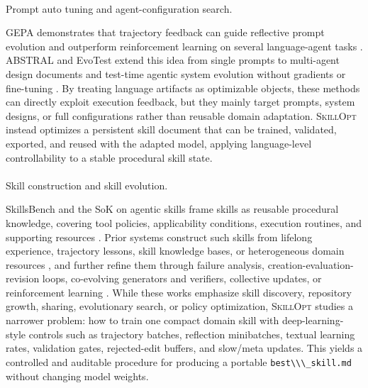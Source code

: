 \documentclass[
]{article}
\makeatletter
\let\oldparagraph\paragraph
\renewcommand{\paragraph}{
    \@ifstar
      \xxxParagraphStar
      \xxxParagraphNoStar
  }
\newcommand{\xxxParagraphStar}[1]{\oldparagraph*{#1}\mbox{}}
\newcommand{\xxxParagraphNoStar}[1]{\oldparagraph{#1}\mbox{}}
\newcommand{\passthrough}[1]{#1}
\newcommand{\ourmethod}{\textsc{SkillOpt}\xspace}
\makeatother
\begin{document}
\paragraph{Prompt auto tuning and agent-configuration
search.}\label{prompt-auto-tuning-and-agent-configuration-search.}

GEPA demonstrates that trajectory feedback can guide reflective prompt
evolution and outperform reinforcement learning on several
language-agent tasks \citep{agrawal2025gepa}. ABSTRAL and EvoTest extend
this idea from single prompts to multi-agent design documents and
test-time agentic system evolution without gradients or fine-tuning
\citep{song2026abstral, he2025evotest}. By treating language artifacts
as optimizable objects, these methods can directly exploit execution
feedback, but they mainly target prompts, system designs, or full
configurations rather than reusable domain adaptation. \ourmethod{}
instead optimizes a persistent skill document that can be trained,
validated, exported, and reused with the adapted model, applying
language-level controllability to a stable procedural skill state.

\paragraph{Skill construction and skill
evolution.}\label{skill-construction-and-skill-evolution.}

SkillsBench and the SoK on agentic skills frame skills as reusable
procedural knowledge, covering tool policies, applicability conditions,
execution routines, and supporting resources
\citep{li2026skillsbench, jiang2026sok}. Prior systems construct such
skills from lifelong experience, trajectory lessons, skill knowledge
bases, or heterogeneous domain resources
\citep{yang2026autoskill, ni2026trace2skill, wang2026skillx, shen2026skillfoundry, memp},
and further refine them through failure analysis,
creation-evaluation-revision loops, co-evolving generators and
verifiers, collective updates, or reinforcement learning
\citep{alzubi2026evoskill, luo2026skillforge, zhang2026coevoskills, ma2026skillclaw, xia2026skillrl, wang2025reinforcement, autorefine, procmem, evolver}.
While these works emphasize skill discovery, repository growth, sharing,
evolutionary search, or policy optimization, \ourmethod{} studies a
narrower problem: how to train one compact domain skill with
deep-learning-style controls such as trajectory batches, reflection
minibatches, textual learning rates, validation gates, rejected-edit
buffers, and slow/meta updates. This yields a controlled and auditable
procedure for producing a portable
\passthrough{\lstinline!best\\\_skill.md!} without changing model
weights.
\end{document}
